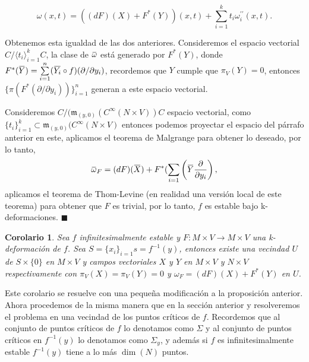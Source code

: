 \documentclass{report}
\newtheorem{coro}[theorem]{Corolario}
\theoremstyle{definition}
\newcommand{\overbar}[1]{\mkern 1.5mu\overline{\mkern-1.5mu#1\mkern-1.5mu}\mkern 1.5mu}
\begin{document}
$$\omega(x,t)= ((dF)(X) + F^\ast(Y))(x,t) + \sum\limits_{i=1}^k t_i \omega_i^{\prime \prime} (x,t) .$$

Obtenemos esta igualdad de las dos anteriores. Consideremos el espacio vectorial $C/ \langle t_i \rangle_{i=1}^k C$, la clase de $\overbar{\omega}$ est\'a generado por $F^\ast (Y)$, donde $F^\ast (\overbar{Y}) = \sum\limits_{i=1}^n (\overbar{Y_i} \circ f)( \partial / \partial y_i )$, recordemos que $Y$ cumple que $\pi_V (Y) = 0$, entonces $\{ \pi (F^\ast ( \partial / \partial y_i ))\}_{i=1}^n$ generan a este espacio vectorial.

Consideremos $C /( \mathfrak{m}_{(y,0)} (C^\infty (N \times V) )C$ espacio vectorial, como $\{ t_i \}_{i=1}^k \subset  \mathfrak{m}_{(y,0)} (C^\infty (N \times V)$ entonces podemos proyectar el espacio del p\'arrafo anterior en este, aplicamos el teorema de Malgrange para obtener lo deseado, por lo tanto, $$\overbar{\omega}_F = (dF) (\overbar{X}) + F^\ast ( \sum\limits_{i=1} \left( \overbar{Y }\frac{\partial}{\partial y_i} \right) , $$ aplicamos el teorema de Thom-Levine (en realidad una versi\'on local de este teorema) para obtener que $F$ es trivial, por lo tanto, $f$ es estable bajo k-deformaciones. $\blacksquare$

\begin{coro}
Sea $f$ infinitesimalmente estable y $F: M \times V \to M \times V$ una k-deformaci\'on de $f$. Sea $S= \{ x_i \}_{i=1}s =f^{-1}(y)$, entonces existe una vecindad $U$ de $S \times \{ 0 \}$ en $M \times V$ y campos vectoriales $X$ y $Y$ en $M \times V$ y $N \times V$ respectivamente con $\pi_V(X)=\pi_V(Y)=0$ y $\omega_F =(dF) (X) + F^\ast (Y)$ en $U$.


\end{coro}

Este corolario se resuelve con una pequeña modificaci\'on a la proposici\'on anterior. Ahora procedemos de la misma manera que en la secci\'on anterior y resolveremos el problema en una vecindad de los puntos cr\'iticos de $f$. Recordemos que al conjunto de puntos cr\'iticos de $f$ lo denotamos como $\Sigma$ y al conjunto de puntos cr\'iticos en $f^{-1} (y)$ lo denotamos como $\Sigma_y$, y adem\'as si $f$ es infinitesimalmente estable $f^{-1}(y)$ tiene a lo m\'as $\dim (N)$ puntos.
\end{document}
